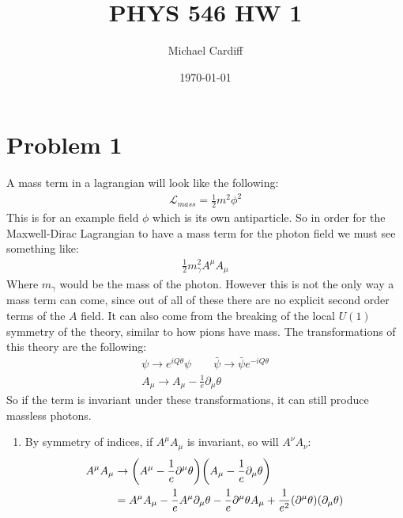 \documentclass[12pt]{article}
\title{\vspace{-3em}PHYS 546 HW 1}
\author{Michael Cardiff}
\date{\today}
\renewcommand{\L}{\mathcal{L}}
\newcommand{\D}{\partial}
\begin{document}
\maketitle

\section*{Problem 1}
A mass term in a lagrangian will look like the following:
\begin{align*}
  \L_{mass}=\frac{1}{2}m^2\phi^2
\end{align*}
This is for an example field $\phi$ which is its own antiparticle. So in order for the Maxwell-Dirac Lagrangian to have a mass term for the photon field we must see something like:
\begin{align*}
  \frac{1}{2}m_\gamma^2A^\mu A_\mu
\end{align*}
Where $m_\gamma$ would be the mass of the photon. However this is not the only way a mass term can come, since out of all of these there are no explicit second order terms of the $A$ field. It can also come from the breaking of the local $U(1)$ symmetry of the theory, similar to how pions have mass. The transformations of this theory are the following:
\begin{gather*}
  \psi\to e^{iQ\theta}\psi\qquad\bar{\psi}\to \bar{\psi}e^{-iQ\theta}\\
  A_\mu\to A_\mu-\frac{1}{e}\D_\mu\theta
\end{gather*}
So if the term is invariant under these transformations, it can still produce massless photons.
\begin{enumerate}[label=\alph*)]
\item By symmetry of indices, if $A^\mu A_\mu$ is invariant, so will $A^\nu A_\nu$:
  \begin{align*}
    A^\mu A_\mu&\to\qty(A^\mu-\frac{1}{e}\D^\mu\theta)
    \qty(A_\mu-\frac{1}{e}\D_\mu\theta)\\
    &=A^\mu A_\mu-\frac{1}{e}A^\mu\D_\mu\theta-\frac{1}{e}\D^\mu\theta A_\mu
    +\frac{1}{e^2}\qty(\D^\mu\theta)\qty(\D_\mu\theta)
  \end{align*}
\end{enumerate}
\end{document}
